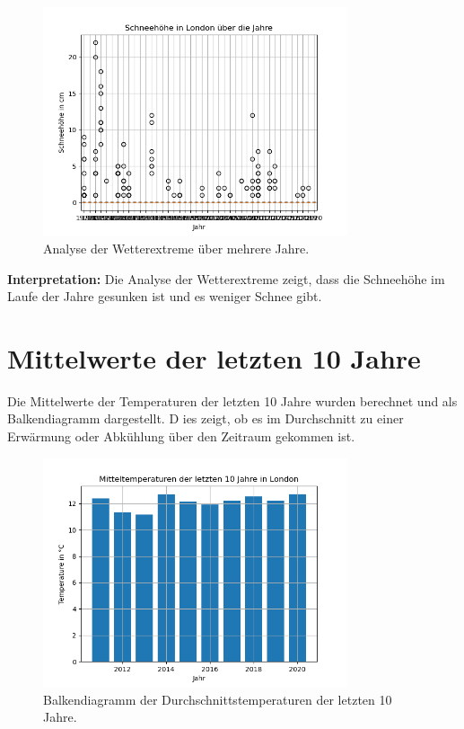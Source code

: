 \documentclass{article}
\begin{document}
\begin{figure}[h!]
    \centering
    \includegraphics[width=0.8\textwidth]{A_1_3_snow.png}
    \caption{Analyse der Wetterextreme über mehrere Jahre.}
\end{figure}

\textbf{Interpretation:} Die Analyse der Wetterextreme zeigt, dass die Schneehöhe im Laufe der Jahre gesunken ist und es weniger Schnee gibt.

\section{Mittelwerte der letzten 10 Jahre}
Die Mittelwerte der Temperaturen der letzten 10 Jahre wurden berechnet und als Balkendiagramm dargestellt. D
ies zeigt, ob es im Durchschnitt zu einer Erwärmung oder Abkühlung über den Zeitraum gekommen ist.

\begin{figure}[h!]
    \centering
    \includegraphics[width=0.8\textwidth]{A_1_4.png}
    \caption{Balkendiagramm der Durchschnittstemperaturen der letzten 10 Jahre.}
\end{figure}
\end{document}

